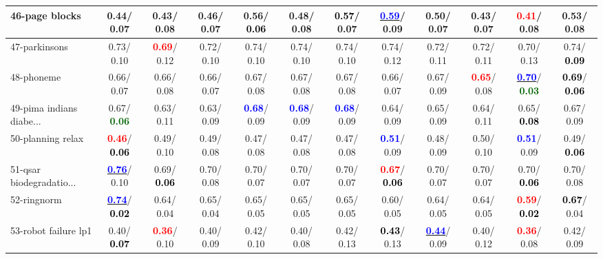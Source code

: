 \begin{table}[h]
\begin{center}
{\begin{tabular}{lc|c|c|c|c|c|c|c|c|c|c}
46-page blocks &   0.44/  0.07 &   0.43/  0.08 &   0.46/  0.07 &   0.56/\textcolor{black}{\textbf{  0.06}} &   0.48/  0.08 & \textcolor{black}{\textbf{  0.57}}/  0.07 & \underline{\textcolor{blue}{\textbf{  0.59}}}/  0.09 &   0.50/  0.07 &   0.43/  0.07 & \textcolor{red}{\textbf{  0.41}}/  0.08 &   0.53/  0.08 \\ \hline
47-parkinsons &   0.73/  0.10 & \textcolor{red}{\textbf{  0.69}}/  0.12 &   0.72/  0.10 &   0.74/  0.10 &   0.74/  0.10 &   0.74/  0.10 &   0.74/  0.12 &   0.72/  0.11 &   0.72/  0.11 &   0.70/  0.13 &   0.74/\textcolor{black}{\textbf{  0.09}} \\
48-phoneme &   0.66/  0.07 &   0.66/  0.08 &   0.66/  0.07 &   0.67/  0.08 &   0.67/  0.08 &   0.67/  0.08 &   0.66/  0.07 &   0.67/  0.09 & \textcolor{red}{\textbf{  0.65}}/  0.08 & \underline{\textcolor{blue}{\textbf{  0.70}}}/\textcolor{darkgreen}{\textbf{  0.03}} & \textcolor{black}{\textbf{  0.69}}/\textcolor{black}{\textbf{  0.06}} \\
49-pima indians diabe... &   0.67/\textcolor{darkgreen}{\textbf{  0.06}} &   0.63/  0.11 &   0.63/  0.09 & \textcolor{blue}{\textbf{  0.68}}/  0.09 & \textcolor{blue}{\textbf{  0.68}}/  0.09 & \textcolor{blue}{\textbf{  0.68}}/  0.09 &   0.64/  0.09 &   0.65/  0.09 &   0.64/  0.11 &   0.65/\textcolor{black}{\textbf{  0.08}} &   0.67/  0.09 \\
50-planning relax & \textcolor{red}{\textbf{  0.46}}/\textcolor{black}{\textbf{  0.06}} &   0.49/  0.10 &   0.49/  0.08 &   0.47/  0.08 &   0.47/  0.08 &   0.47/  0.08 & \textcolor{blue}{\textbf{  0.51}}/  0.09 &   0.48/  0.09 &   0.50/  0.10 & \textcolor{blue}{\textbf{  0.51}}/  0.09 &   0.49/\textcolor{black}{\textbf{  0.06}} \\
51-qsar biodegradatio... & \underline{\textcolor{blue}{\textbf{  0.76}}}/  0.10 &   0.69/\textcolor{black}{\textbf{  0.06}} &   0.70/  0.08 &   0.70/  0.07 &   0.70/  0.07 &   0.70/  0.07 & \textcolor{red}{\textbf{  0.67}}/\textcolor{black}{\textbf{  0.06}} &   0.70/  0.07 &   0.70/  0.07 &   0.70/\textcolor{black}{\textbf{  0.06}} &   0.70/  0.08 \\
52-ringnorm & \underline{\textcolor{blue}{\textbf{  0.74}}}/\textcolor{black}{\textbf{  0.02}} &   0.64/  0.04 &   0.65/  0.04 &   0.65/  0.05 &   0.65/  0.05 &   0.65/  0.05 &   0.60/  0.05 &   0.64/  0.05 &   0.64/  0.05 & \textcolor{red}{\textbf{  0.59}}/\textcolor{black}{\textbf{  0.02}} & \textcolor{black}{\textbf{  0.67}}/  0.04 \\
53-robot failure lp1 &   0.40/\textcolor{black}{\textbf{  0.07}} & \textcolor{red}{\textbf{  0.36}}/  0.10 &   0.40/  0.09 &   0.42/  0.10 &   0.40/  0.08 &   0.42/  0.13 & \textcolor{black}{\textbf{  0.43}}/  0.13 & \underline{\textcolor{blue}{\textbf{  0.44}}}/  0.09 &   0.40/  0.12 & \textcolor{red}{\textbf{  0.36}}/  0.08 &   0.42/  0.09 \\ \hline

\end{tabular}}
\end{center}
\end{table}
